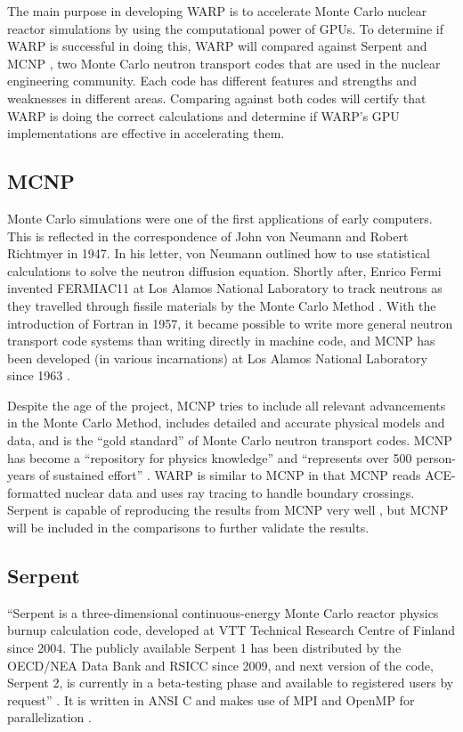 The main purpose in developing WARP is to accelerate Monte Carlo nuclear reactor simulations by using the computational power of GPUs.  To determine if WARP is successful in doing this, WARP will compared against Serpent \cite{jaakko} and MCNP \cite{mcnp}, two Monte Carlo neutron transport codes that are used in the nuclear engineering community.  Each code has different features and strengths and weaknesses in different areas. Comparing against both codes will certify that WARP is doing the correct calculations and determine if WARP's GPU implementations are effective in accelerating them.  

\subsection{MCNP}

Monte Carlo simulations were one of the first applications of early computers.   This is reflected in the correspondence of John von Neumann and  Robert Richtmyer  in 1947.  In his letter, von Neumann outlined how to use statistical calculations to solve the neutron diffusion equation.  Shortly after, Enrico Fermi invented FERMIAC11 at Los Alamos National Laboratory to track neutrons as they travelled through fissile materials by the Monte Carlo Method \cite{mcnp}.  With the introduction of Fortran in 1957, it became possible to write more general neutron transport code systems than writing directly in machine code, and MCNP has been developed (in various incarnations) at Los Alamos National Laboratory since 1963 \cite{mcnp}.
 
Despite the age of the project, MCNP tries to include all relevant advancements in the Monte Carlo Method, includes detailed and accurate physical models and data, and is the ``gold standard'' of Monte Carlo neutron transport codes.  MCNP has become a ``repository for physics knowledge'' and ``represents over 500 person-years of sustained effort'' \cite{mcnp}.   WARP is similar to MCNP in that MCNP reads ACE-formatted nuclear data and uses ray tracing to handle boundary crossings.  Serpent is capable of reproducing the results from MCNP very well \cite{jaakko}, but MCNP will be included in the comparisons to further validate the results.

\subsection{Serpent}

``Serpent is a three-dimensional continuous-energy Monte Carlo reactor physics burnup calculation code, developed at VTT Technical Research Centre of Finland since 2004. The publicly available Serpent 1 has been distributed by the OECD/NEA Data Bank and RSICC since 2009, and next version of the code, Serpent 2, is currently in a beta-testing phase and available to registered users by request'' \cite{serpent}.  It is written in ANSI C and makes use of MPI and OpenMP for parallelization \cite{jaakko}.

